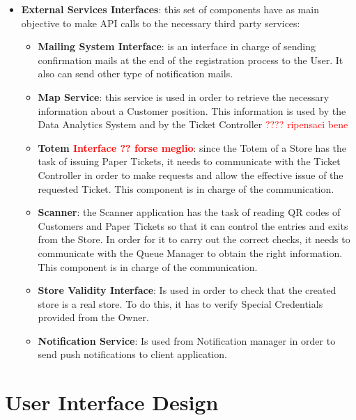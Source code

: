 \documentclass[a4paper, 12pt, oneside, table]{article}
\newcommand{\yasmin}[1]{\textcolor{Red}{#1}}
\begin{document}
\begin{itemize}
\begin{itemize}
    \end{itemize}
    \item \textbf{External Services Interfaces}: this set of components have as main objective to make API calls to the necessary third party services:
    \begin{itemize}
        \item \textbf{Mailing System Interface}: is an interface in charge of sending confirmation mails at the end of the registration process to the User. It also can send other type of notification mails.
        \item \textbf{Map Service}: this service is used in order to retrieve the necessary information about a Customer position. This information is used by the Data Analytics System and by the Ticket Controller \yasmin{???? ripensaci bene}
        \item \textbf{Totem \yasmin{Interface ?? forse meglio}}: since the Totem of a Store has the task of issuing Paper Tickets, it needs to communicate with the Ticket Controller in order to make requests and allow the effective issue of the requested Ticket. This component is in charge of the communication.
        \item \textbf{Scanner}: the Scanner application has the task of reading QR codes of Customers and Paper Tickets so that it can control the entries and exits from the Store. In order for it to carry out the correct checks, it needs to communicate with the Queue Manager to obtain the right information. This component is in charge of the communication.
        \item \textbf{Store Validity Interface}: Is used in order to check that the created store is a real store. To do this, it has to verify Special Credentials provided from the Owner.
        
        \item \textbf{Notification Service}: Is used from Notification manager in order to send push notifications to client application.
    \end{itemize}
    
\end{itemize}

\newpage
\section{User Interface Design}
\end{document}
